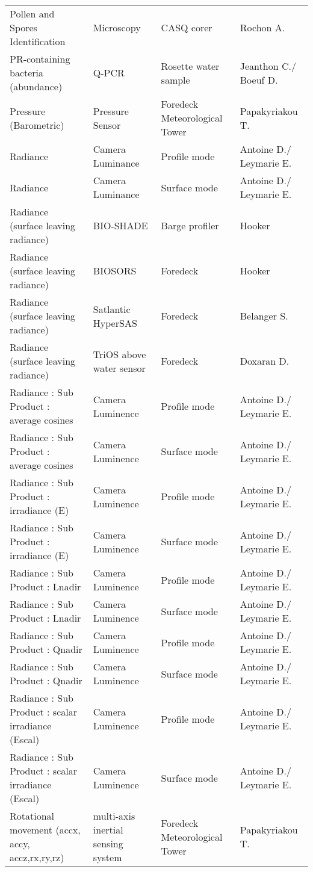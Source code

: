 \begin{longtable}[t]{llll}
\addlinespace
Pollen and Spores Identification & Microscopy & CASQ corer & Rochon A.\\
PR-containing bacteria (abundance) & Q-PCR & Rosette water sample & Jeanthon C./ Boeuf D.\\
Pressure (Barometric) & Pressure Sensor & Foredeck Meteorological Tower & Papakyriakou T.\\
Radiance & Camera Luminance & Profile mode & Antoine D./ Leymarie E.\\
Radiance & Camera Luminance & Surface mode & Antoine D./ Leymarie E.\\
\addlinespace
Radiance (surface leaving radiance) & BIO-SHADE & Barge profiler & Hooker\\
Radiance (surface leaving radiance) & BIOSORS & Foredeck & Hooker\\
Radiance (surface leaving radiance) & Satlantic HyperSAS & Foredeck & Belanger S.\\
Radiance (surface leaving radiance) & TriOS above water sensor & Foredeck & Doxaran D.\\
Radiance : Sub Product : average cosines & Camera Luminence & Profile mode & Antoine D./ Leymarie E.\\
\addlinespace
Radiance : Sub Product : average cosines & Camera Luminence & Surface mode & Antoine D./ Leymarie E.\\
Radiance : Sub Product : irradiance (E) & Camera Luminence & Profile mode & Antoine D./ Leymarie E.\\
Radiance : Sub Product : irradiance (E) & Camera Luminence & Surface mode & Antoine D./ Leymarie E.\\
Radiance : Sub Product : Lnadir & Camera Luminence & Profile mode & Antoine D./ Leymarie E.\\
Radiance : Sub Product : Lnadir & Camera Luminence & Surface mode & Antoine D./ Leymarie E.\\
\addlinespace
Radiance : Sub Product : Qnadir & Camera Luminence & Profile mode & Antoine D./ Leymarie E.\\
Radiance : Sub Product : Qnadir & Camera Luminence & Surface mode & Antoine D./ Leymarie E.\\
Radiance : Sub Product : scalar irradiance (Escal) & Camera Luminence & Profile mode & Antoine D./ Leymarie E.\\
Radiance : Sub Product : scalar irradiance (Escal) & Camera Luminence & Surface mode & Antoine D./ Leymarie E.\\
Rotational movement (accx, accy, accz,rx,ry,rz) & multi-axis inertial sensing system & Foredeck Meteorological Tower & Papakyriakou T.\\

\end{longtable}
